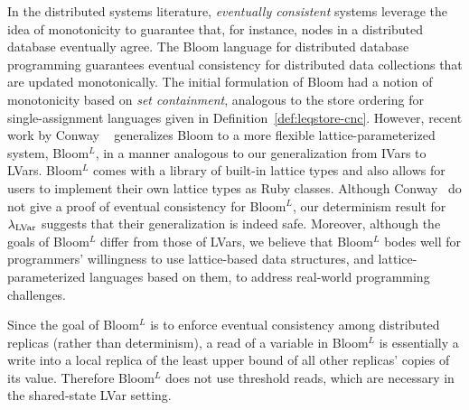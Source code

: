 %
In the distributed systems literature, \emph{eventually
  consistent} systems \cite{eventual-consistency} 
leverage the idea of monotonicity to guarantee that,
for instance, nodes in a distributed database eventually agree.
The Bloom language for distributed database programming \cite{bloom-cidr} guarantees eventual consistency for
distributed data collections that are updated monotonically.
The initial formulation of Bloom 
had a notion of monotonicity based on \emph{set containment},
analogous to the store ordering for single-assignment languages given in 
Definition~\ref{def:leqstore-cnc}.
However, recent work
by Conway \etal~\cite{blooml} generalizes Bloom to a more flexible
lattice-parameterized system, Bloom$^L$, in a manner analogous
to our generalization from IVars to LVars.
Bloom$^L$ comes with a library of built-in lattice types and also
allows for users to implement their own lattice types as Ruby classes.
Although Conway \etal~do not give a proof of eventual consistency for
Bloom$^L$, our determinism result for $\textup{\ensuremath{\lambda_{\textrm{LVar}}}}$ suggests that
their generalization is indeed safe.
Moreover, although the goals of Bloom$^L$
differ from those of LVars, we believe that Bloom$^L$ bodes well for
programmers' willingness to use lattice-based data structures,
and lattice-parameterized languages based on them, to address
real-world programming challenges.

Since the goal of Bloom$^L$ is to enforce eventual consistency among
distributed replicas (rather than determinism), a read of a variable
in Bloom$^L$ is essentially a write into a local replica of the least
upper bound of all other replicas' copies of its value.  Therefore
Bloom$^L$ does not use threshold reads, which are necessary in the
shared-state LVar setting.
\fi{}


